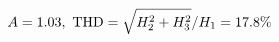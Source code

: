 \documentclass[preview]{standalone}
\begin{document}
\begin{align*}
\special{dvisvgm:raw <g id='unique000'>}A=1.03,\ \text{THD}=\sqrt{H_2^2+H_3^2}/H_1=17.8\%\special{dvisvgm:raw </g>}
\end{align*}
\end{document}
